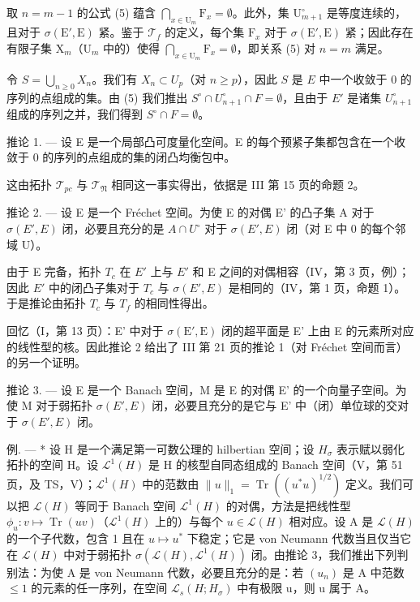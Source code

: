 取 \(n = m - 1\) 的公式 (5) 蕴含 \(\bigcap_{x\in \mathrm{U}_m}\mathrm{F}_x = \emptyset\)。此外，集 \(\mathrm{U}_{m + 1}^{\circ}\) 是等度连续的，且对于 \(\sigma (\mathrm{E}',\mathrm{E})\) 紧。鉴于 \(\mathcal{T}_f\) 的定义，每个集 \(\mathrm{F}_x\) 对于 \(\sigma (\mathrm{E}',\mathrm{E})\) 紧；因此存在有限子集 \(\mathrm{X}_m\)（\(\mathrm{U}_m\) 中的）使得 \(\bigcap_{x\in \mathrm{U}_m}\mathrm{F}_x = \emptyset\)，即关系 (5) 对 \(n = m\) 满足。

令 \(S = \bigcup_{n\geqslant 0}X_n\)。我们有 \(X_{n}\subset U_{p}\)（对 \(n\geqslant p\)），因此 \(S\) 是 \(E\) 中一个收敛于 0 的序列的点组成的集。由 (5) 我们推出 \(S^{\circ}\cap U_{n + 1}^{\circ}\cap F = \emptyset\)，且由于 \(E'\) 是诸集 \(U_{n + 1}^{\circ}\) 组成的序列之并，我们得到 \(S^{\circ}\cap F = \emptyset\)。

推论 1. --- 设 E 是一个局部凸可度量化空间。E 的每个预紧子集都包含在一个收敛于 0 的序列的点组成的集的闭凸均衡包中。

这由拓扑 \(\mathcal{T}_{pc}\) 与 \(\mathcal{T}_{\mathfrak{N}}\) 相同这一事实得出，依据是 III 第 15 页的命题 2。

推论 2. --- 设 E 是一个 Fréchet 空间。为使 E 的对偶 E' 的凸子集 A 对于 \(\sigma(E', E)\) 闭，必要且充分的是 \(A \cap U^{\circ}\) 对于 \(\sigma(E', E)\) 闭（对 E 中 0 的每个邻域 U）。

由于 E 完备，拓扑 \(T_{c}\) 在 \(E'\) 上与 \(E'\) 和 E 之间的对偶相容（IV，第 3 页，例）；因此 \(E'\) 中的闭凸子集对于 \(T_{c}\) 与 \(\sigma(E', E)\) 是相同的（IV，第 1 页，命题 1）。于是推论由拓扑 \(T_{c}\) 与 \(T_{f}\) 的相同性得出。

回忆（I，第 13 页）：E' 中对于 \(\sigma(\mathrm{E}', \mathrm{E})\) 闭的超平面是 E' 上由 E 的元素所对应的线性型的核。因此推论 2 给出了 III 第 21 页的推论 1（对 Fréchet 空间而言）的另一个证明。

推论 3. --- 设 E 是一个 Banach 空间，M 是 E 的对偶 E' 的一个向量子空间。为使 M 对于弱拓扑 \(\sigma(E', E)\) 闭，必要且充分的是它与 E' 中（闭）单位球的交对于 \(\sigma(E', E)\) 闭。

例. --- * 设 H 是一个满足第一可数公理的 hilbertian 空间；设 \(H_{\sigma}\) 表示赋以弱化拓扑的空间 H。设 \(\mathcal{L}^{1}(H)\) 是 H 的核型自同态组成的 Banach 空间（V，第 51 页，及 TS，V）；\(\mathcal{L}^{1}(H)\) 中的范数由 \(\|u\|_{1} = \operatorname{Tr}((u^{*}u)^{1/2})\) 定义。我们可以把 \(\mathcal{L}(H)\) 等同于 Banach 空间 \(\mathcal{L}^{1}(H)\) 的对偶，方法是把线性型 \(\phi_{u}: v \mapsto \operatorname{Tr}(uv)\)（\(\mathcal{L}^{1}(H)\) 上的）与每个 \(u \in \mathcal{L}(H)\) 相对应。设 A 是 \(\mathcal{L}(H)\) 的一个子代数，包含 1 且在 \(u \mapsto u^{*}\) 下稳定；它是 von Neumann 代数当且仅当它在 \(\mathcal{L}(H)\) 中对于弱拓扑 \(\sigma(\mathcal{L}(H), \mathcal{L}^{1}(H))\) 闭。由推论 3，我们推出下列判别法：为使 A 是 von Neumann 代数，必要且充分的是：若 \((u_{n})\) 是 A 中范数 \(\leqslant 1\) 的元素的任一序列，在空间 \(\mathcal{L}_{s}(H; H_{\sigma})\) 中有极限 u，则 u 属于 A。

